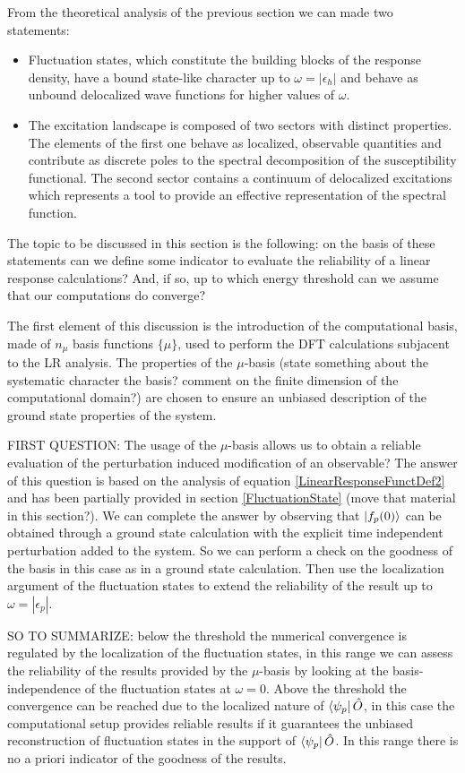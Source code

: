\documentclass[reprint,aps,prb]{revtex4-1}
\newcommand{\eps}{\epsilon}
\newcommand{\op}[1]{\hat {#1}}
\begin{document}
From the theoretical analysis of the previous section we can made two statements:
\begin{itemize}
 \item Fluctuation states, which constitute the building blocks of the response density, have a bound state-like character up to $\omega=|\eps_h|$ and behave as unbound delocalized
 wave functions for higher values of $\omega$. 
 \item The excitation landscape is composed of two sectors with distinct properties. The elements of the first one behave as localized, observable quantities and contribute as discrete 
 poles to the spectral decomposition of the susceptibility functional. The second sector contains a continuum of delocalized excitations which represents a tool to provide
 an effective representation of the spectral function. 
\end{itemize}
The topic to be discussed in this section is the following: on the basis of these statements can we define some indicator to evaluate the reliability of a linear response calculations? And, 
if so, up to which energy threshold can we assume that our computations do converge?

The first element of this discussion is the introduction of the computational basis, made of $n_\mu$ basis functions $\{\mu\}$, used to perform the DFT calculations subjacent to the LR analysis. 
The properties of the $\mu$-basis (state something about the systematic character the basis? comment on the finite dimension of the computational domain?) are chosen to ensure an unbiased description 
of the ground state properties of the system. 

FIRST QUESTION: The usage of the $\mu$-basis allows us to obtain a reliable evaluation of the perturbation induced modification of an observable? 
The answer of this question is based on the analysis of equation \eqref{LinearResponseFunctDef2} and has been partially provided in section \ref{FluctuationState} (move that material in this section?). 
We can complete the answer by observing that $\ket{f_p(0)}$ can be obtained through a ground state calculation with the explicit time independent perturbation added to the system. So we can perform
a check on the goodness of the basis in this case as in a ground state calculation. Then use the localization argument of the fluctuation states to extend the reliability of the result up to
$\omega=|\eps_p|$. 

SO TO SUMMARIZE: below the threshold the numerical convergence is regulated by the localization of the fluctuation states, in this range we can assess the reliability of the results provided by
the $\mu$-basis by looking at the basis-independence of the fluctuation states at $\omega=0$. Above the threshold the convergence can be reached due to the localized nature of $\bra{\psi_p}\op O$, 
in this case the computational setup provides reliable results if it guarantees the unbiased reconstruction of fluctuation states in the support of $\bra{\psi_p}\op O$. In this range there is no a 
priori indicator of the goodness of the results. 
\end{document}
